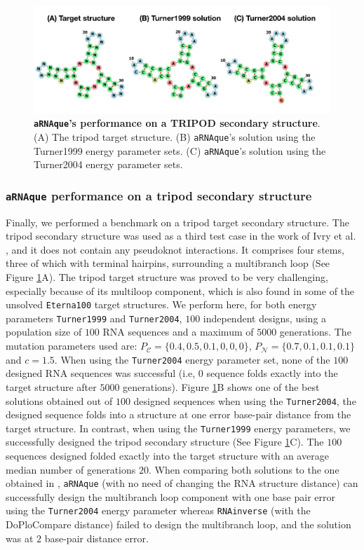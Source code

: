 \begin{figure}[t!]
	\includegraphics[width=1.0\linewidth]{../res/images/arnaque/fig9.png}
	\caption{\textbf{\texttt{aRNAque}'s performance on a TRIPOD secondary structure}. (A) The tripod target structure. (B) \texttt{aRNAque}'s solution using the Turner1999 energy parameter sets. (C) \texttt{aRNAque}'s solution using the Turner2004 energy parameter sets.}
	\label{Fig:tripod}
\end{figure}
\subsubsection{\texttt{aRNAque} performance on a tripod secondary structure}

Finally, we performed a benchmark on a tripod target secondary structure. The tripod secondary structure was used as a third test case in the work of Ivry et al. \cite{ivry2009image}, and it does not contain any pseudoknot interactions. It comprises four stems, three of which with terminal hairpins, surrounding a multibranch loop (See Figure \ref{Fig:tripod}A). The tripod target structure was proved to be very challenging, especially because of its multiloop component, which is also found in some of the unsolved \texttt{Eterna100} target structures. We perform here, for both energy parameters \texttt{Turner1999} and  \texttt{Turner2004}, $100$ independent designs, using a population size of $100$ RNA sequences and a maximum of $5000$ generations. The mutation parameters used are: $P_{\mathcal{C}}=\{0.4,0.5,0.1,0,0,0\}$, $P_{\mathcal{N}}=\{0.7,0.1,0.1,0.1\}$ and $c=1.5$. When using the \texttt{Turner2004} energy parameter set, none of the $100$ designed RNA sequences was successful (i.e, $0$ sequence folds exactly into the target structure after $5000$ generations). Figure \ref{Fig:tripod}B shows one of the best solutions obtained out of $100$ designed sequences when using the \texttt{Turner2004}, the designed sequence folds into a structure at one error base-pair distance from the target structure. In contrast, when using the \texttt{Turner1999} energy parameters, we successfully designed the tripod secondary structure (See Figure \ref{Fig:tripod}C). The $100$ sequences designed folded exactly into the target structure with an average median number of generations $20$. When comparing both solutions to the one obtained in \cite{ivry2009image}, \texttt{aRNAque} (with no need of changing the RNA structure distance) can successfully design the multibranch loop component with one base pair error using the \texttt{Turner2004} energy parameter whereas \texttt{RNAinverse} (with the DoPloCompare distance) failed to design the multibranch loop, and the solution was at $2$ base-pair distance error.

